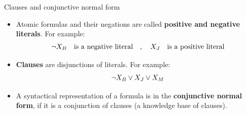 \documentclass{beamer}
\begin{document}
    \begin{frame}{Clauses and conjunctive normal form}

        \begin{itemize}
            \item Atomic formulas and their negations are called {\bf positive and negative literals}.
            For example:
            \begin{align*}
                \lnot X_{B} \quad \text{is a negative literal}
                \quad, \quad
                X_{J} \quad \text{is a positive literal}
            \end{align*}
            \item {\bf Clauses} are disjunctions of literals.
            For example:
            \begin{align*}
                \lnot X_{B} \lor X_{J} \lor X_{M}
            \end{align*}
            \item A syntactical representation of a formula is in the {\bf conjunctive normal form}, if it is a conjunction of clauses (a knowledge base of clauses).
        \end{itemize}
    \end{frame}
\end{document}
